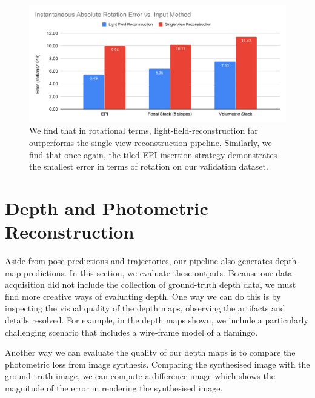 \begin{figure}[H]
    \includegraphics[width=\textwidth]{images/result-examples/bargraphs/iare-vs-input-method.pdf}
    \caption{We find that in rotational terms, light-field-reconstruction far outperforms the single-view-reconstruction pipeline. Similarly, we find that once again, the tiled EPI insertion strategy demonstrates the smallest error in terms of rotation on our validation dataset.}
\end{figure}
\section{Depth and Photometric Reconstruction}

Aside from pose predictions and trajectories, our pipeline also generates depth-map predictions. In this section, we evaluate these outputs. Because our data acquisition did not include the collection of ground-truth depth data, we must find more creative ways of evaluating depth. One way we can do this is by inspecting the visual quality of the depth maps, observing the artifacts and details resolved. For example, in the depth maps shown, we include a particularly challenging scenario that includes a wire-frame model of a flamingo. 

Another way we can evaluate the quality of our depth maps is to compare the photometric loss from image synthesis. Comparing the synthesised image with the ground-truth image, we can compute a difference-image which shows the magnitude of the error in rendering the synthesised image.


